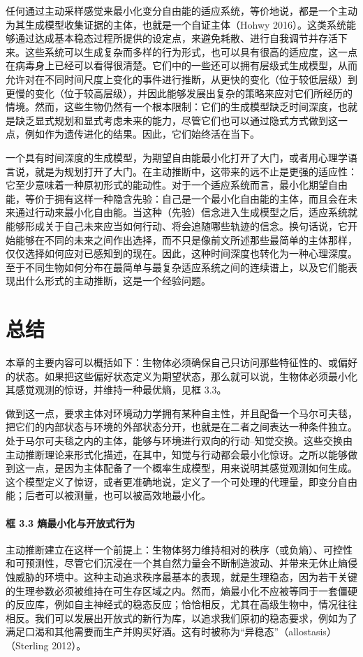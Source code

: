 任何通过主动采样感觉来最小化变分自由能的适应系统，等价地说，都是一个主动为其生成模型收集证据的主体，也就是一个自证主体（Hohwy 2016）。这类系统能够通过达成基本稳态过程所提供的设定点，来避免耗散、进行自我调节并存活下来。这些系统可以生成复杂而多样的行为形式，也可以具有很高的适应度，这一点在病毒身上已经可以看得很清楚。它们中的一些还可以拥有层级式生成模型，从而允许对在不同时间尺度上变化的事件进行推断，从更快的变化（位于较低层级）到更慢的变化（位于较高层级），并因此能够发展出复杂的策略来应对它们所经历的情境。然而，这些生物仍然有一个根本限制：它们的生成模型缺乏时间深度，也就是缺乏显式规划和显式考虑未来的能力，尽管它们也可以通过隐式方式做到这一点，例如作为遗传进化的结果。因此，它们始终活在当下。

一个具有时间深度的生成模型，为期望自由能最小化打开了大门，或者用心理学语言说，就是为规划打开了大门。在主动推断中，这带来的远不止是更强的适应性：它至少意味着一种原初形式的能动性。对于一个适应系统而言，最小化期望自由能，等价于拥有这样一种隐含先验：自己是一个最小化自由能的主体，而且会在未来通过行动来最小化自由能。当这种（先验）信念进入生成模型之后，适应系统就能够形成关于自己未来应当如何行动、将会追随哪些轨迹的信念。换句话说，它开始能够在不同的未来之间作出选择，而不只是像前文所述那些最简单的主体那样，仅仅选择如何应对已感知到的现在。因此，这种时间深度也转化为一种心理深度。至于不同生物如何分布在最简单与最复杂适应系统之间的连续谱上，以及它们能表现出什么形式的主动推断，这是一个经验问题。

\section{总结}

本章的主要内容可以概括如下：生物体必须确保自己只访问那些特征性的、或偏好的状态。如果把这些偏好状态定义为期望状态，那么就可以说，生物体必须最小化其感觉观测的惊讶，并维持一种最优熵，见框 3.3。

做到这一点，要求主体对环境动力学拥有某种自主性，并且配备一个马尔可夫毯，把它们的内部状态与环境的外部状态分开，也就是在二者之间表达一种条件独立。处于马尔可夫毯之内的主体，能够与环境进行双向的行动--知觉交换。这些交换由主动推断理论来形式化描述，在其中，知觉与行动都会最小化惊讶。之所以能够做到这一点，是因为主体配备了一个概率生成模型，用来说明其感觉观测如何生成。这个模型定义了惊讶，或者更准确地说，定义了一个可处理的代理量，即变分自由能；后者可以被测量，也可以被高效地最小化。

\paragraph{框 3.3 熵最小化与开放式行为}
主动推断建立在这样一个前提上：生物体努力维持相对的秩序（或负熵）、可控性和可预测性，尽管它们沉浸在一个其自然力量会不断制造波动、并带来无休止熵侵蚀威胁的环境中。这种主动追求秩序最基本的表现，就是生理稳态，因为若干关键的生理参数必须被维持在可生存区域之内。然而，熵最小化不应被等同于一套僵硬的反应库，例如自主神经式的稳态反应；恰恰相反，尤其在高级生物中，情况往往相反。我们可以发展出开放式的新行为库，以追求我们原初的稳态要求，例如为了满足口渴和其他需要而生产并购买好酒。这有时被称为“异稳态”（allostasis）（Sterling 2012）。


